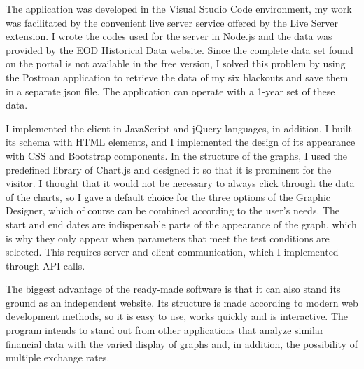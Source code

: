 The application was developed in the Visual Studio Code environment, my work was facilitated by the convenient live server service offered by the Live Server extension. I wrote the codes used for the server in Node.js and the data was provided by the EOD Historical Data website. Since the complete data set found on the portal is not available in the free version, I solved this problem by using the Postman application to retrieve the data of my six blackouts and save them in a separate json file. The application can operate with a 1-year set of these data.

I implemented the client in JavaScript and jQuery languages, in addition, I built its schema with HTML elements, and I implemented the design of its appearance with CSS and Bootstrap components. In the structure of the graphs, I used the predefined library of Chart.js and designed it so that it is prominent for the visitor. I thought that it would not be necessary to always click through the data of the charts, so I gave a default choice for the three options of the Graphic Designer, which of course can be combined according to the user's needs. The start and end dates are indispensable parts of the appearance of the graph, which is why they only appear when parameters that meet the test conditions are selected. This requires server and client communication, which I implemented through API calls.

The biggest advantage of the ready-made software is that it can also stand its ground as an independent website. Its structure is made according to modern web development methods, so it is easy to use, works quickly and is interactive. The program intends to stand out from other applications that analyze similar financial data with the varied display of graphs and, in addition, the possibility of multiple exchange rates.